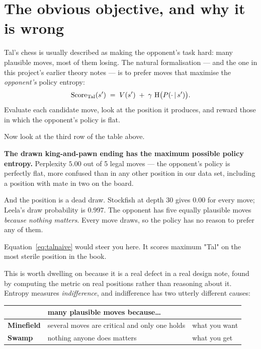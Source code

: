 \section{The obvious objective, and why it is wrong}

Tal's chess is usually described as making the opponent's task hard: many plausible moves,
most of them losing. The natural formalisation --- and the one in this project's earlier
theory notes --- is to prefer moves that maximise the \emph{opponent's} policy entropy:
\begin{equation}
  \label{eq:talnaive}
  \text{Score}_{\text{Tal}}(s') \;=\; V(s') \;+\; \gamma\,\operatorname{H}\bigl(P(\cdot\,|\, s')\bigr) .
\end{equation}
Evaluate each candidate move, look at the position it produces, and reward those in which the
opponent's policy is flat.

Now look at the third row of the table above.

\begin{pitfall}
\textbf{The drawn king-and-pawn ending has the maximum possible policy entropy.} Perplexity
$5.00$ out of 5 legal moves --- the opponent's policy is perfectly flat, more confused than in
any other position in our data set, including a position with mate in two on the board.

And the position is a dead draw. Stockfish at depth 30 gives $0.00$ for every move; Leela's
draw probability is $0.997$. The opponent has five equally plausible moves \emph{because
nothing matters}. Every move draws, so the policy has no reason to prefer any of them.

Equation~\eqref{eq:talnaive} would steer you here. It scores maximum "Tal" on the most
sterile position in the book.
\end{pitfall}

This is worth dwelling on because it is a real defect in a real design note, found by
computing the metric on real positions rather than reasoning about it. Entropy measures
\emph{indifference}, and indifference has two utterly different causes:

\begin{center}
\begin{tabular}{@{}lll@{}}
\toprule
 & many plausible moves because\ldots & \\
\midrule
\textbf{Minefield} & several moves are critical and only one holds & what you want \\
\textbf{Swamp} & nothing anyone does matters & what you get \\
\bottomrule
\end{tabular}
\end{center}

